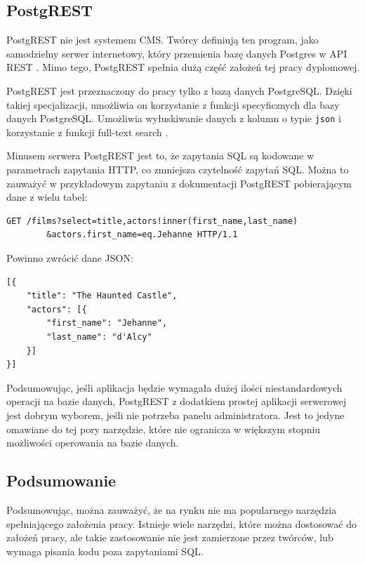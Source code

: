 
\subsection{PostgREST}

PostgREST nie jest systemem CMS. Twórcy definiują ten program, jako samodzielny
serwer internetowy, który przemienia bazę danych Postgres w API REST
\cite{PostgrestDefinition}. Mimo tego, PostgREST spełnia dużą część założeń tej
pracy dyplomowej.

PostgREST jest przeznaczony do pracy tylko z bazą danych PostgreSQL. Dzięki
takiej specjalizacji, umożliwia on korzystanie z funkcji specyficznych dla bazy
danych PostgreSQL. Umożliwia wyłuskiwanie danych z kolumn o typie \texttt{json}
\cite{PostgrestJson} i korzystanie z funkcji full-text search \cite{PostgrestFts}.

Minusem serwera PostgREST jest to, że zapytania SQL są kodowane w parametrach
zapytania HTTP, co zmniejsza czytelność zapytań SQL. Można to zauważyć w
przykładowym zapytaniu z dokumentacji PostgREST pobierającym dane z wielu tabel:

\begin{verbatim}
GET /films?select=title,actors!inner(first_name,last_name)
        &actors.first_name=eq.Jehanne HTTP/1.1
\end{verbatim}

\noindent Powinno zwrócić dane JSON:

\begin{verbatim}
[{
    "title": "The Haunted Castle",
    "actors": [{
        "first_name": "Jehanne",
        "last_name": "d'Alcy"
    }]
}]
\end{verbatim}

Podsumowując, jeśli aplikacja będzie wymagała dużej ilości niestandardowych
operacji na bazie danych, PostgREST z dodatkiem prostej aplikacji serwerowej
jest dobrym wyborem, jeśli nie potrzeba panelu administratora. Jest to jedyne
omawiane do tej pory narzędzie, które nie ogranicza w większym stopniu
możliwości operowania na bazie danych.

\subsection{Podsumowanie}

Podsumowując, można zauważyć, że na rynku nie ma popularnego narzędzia
spełniającego założenia pracy. Istnieje wiele narzędzi, które można dostosować
do założeń pracy, ale takie zastosowanie nie jest zamierzone przez twórców, lub
wymaga pisania kodu poza zapytaniami SQL.
